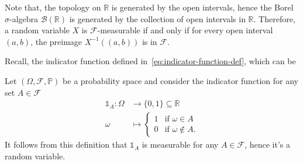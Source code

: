 Note that, the topology on $\mathbb{R}$ is generated by the open intervals, hence the Borel $\sigma$-algebra $\mathcal{B}(\mathbb{R})$ is generated by the collection of open intervals in $\mathbb{R}$. Therefore, a random variable $X$ is $\mathcal{F}$-measurable if and only if for every open interval $(a, b)$, the preimage $X^{-1}((a, b))$ is in $\mathcal{F}$.

Recall, the indicator function defined in~\ref{eq:indicator-function-def}, which can be

\begin{example}
    \label{ex:indicator-function-in-probability}
    Let $(\Omega, \mathcal{F}, \mathbb{P})$ be a probability space and consider the indicator function for any set $A \in \mathcal{F}$
    \[
        \begin{aligned}
            \mathds{1}_A: \Omega &\to \{0, 1\} \subseteq \mathbb{R} \\
            \omega &\mapsto \begin{cases}
                               1 & \text{if } \omega \in A \\
                               0 & \text{if } \omega \notin A.
            \end{cases}
        \end{aligned}
    \]
    It follows from this definition that $\mathds{1}_A$ is measurable for any $A \in \mathcal{F}$, hence it's a random variable.
\end{example}

